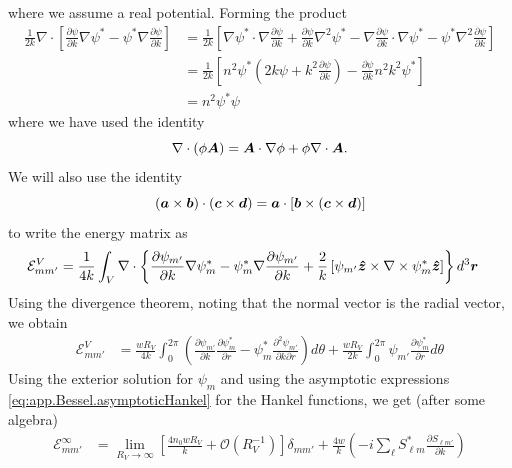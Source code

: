 where we assume a real potential.
Forming the product
  \begin{align*}
   \frac{1}{2k}\nabla\cdot\left[\frac{\partial\psi}{\partial k}\nabla\psi^*-\psi^*\nabla\frac{\partial\psi}{\partial k}\right]
	&= \frac{1}{2k}\left[\nabla\psi^*\cdot\nabla\frac{\partial\psi}{\partial k}+\frac{\partial\psi}{\partial k}\nabla^2\psi^*
			  -\nabla\frac{\partial\psi}{\partial k}\cdot\nabla\psi^*-\psi^*\nabla^2\frac{\partial\psi}{\partial k}\right]	\\
	&= \frac{1}{2k}\left[n^2\psi^*\left(2k\psi+k^2\frac{\partial\psi}{\partial k}\right)-\frac{\partial\psi}{\partial k}n^2k^2\psi^*\right]\\
	&= n^2\psi^*\psi
  \end{align*}
where we have used the identity \cite[Appendix II]{STR41}
  \begin{equation}
    \nabla\cdot\left(\phi\boldsymbol{A}\right) = \boldsymbol{A}\cdot\nabla\phi+\phi\nabla\cdot\boldsymbol{A}.
  \end{equation}
We will also use the
identity
  \begin{equation}
    (\boldsymbol{a}\times\boldsymbol{b})\cdot(\boldsymbol{c}\times\boldsymbol{d}) = \boldsymbol{a}\cdot\left[\boldsymbol{b}\times(\boldsymbol{c}\times\boldsymbol{d})\right]
  \end{equation}
to write the energy matrix as
  \begin{align}
    \mathcal{E}^V_{mm'} &= \frac{1}{4k}\int_V\nabla\cdot
			    \left\{
			      \frac{\partial\psi_{m'}}{\partial k}\nabla\psi^*_{m}-\psi^*_m\nabla\frac{\partial\psi_{m'}}{\partial k}
			+   \frac{2}{k}\left[\psi_{m'}\boldsymbol{\hat{z}}\times\nabla\times\psi^*_m\boldsymbol{\hat{z}}\right]\right\}d^3\boldsymbol{r}
  \end{align}
Using the divergence theorem, noting that the normal vector
is the radial vector, we obtain
  \begin{align}
    \mathcal{E}^V_{mm'}	&= \frac{wR_V}{4k}
			  \int_0^{2\pi}\left(\frac{\partial\psi_{m'}}{\partial k}\frac{\partial\psi^*_m}{\partial r}
					      -\psi^*_m\frac{\partial^2\psi_{m'}}{\partial k\partial r}\right)d\theta	\nonumber
			+\frac{wR_V}{2k}
			  \int_0^{2\pi}\psi_{m'}\frac{\partial\psi^*_m}{\partial r} d\theta
  \end{align}
Using the exterior solution for $\psi_m$ and using the 
asymptotic expressions \eqref{eq:app.Bessel.asymptoticHankel} for the Hankel functions, we get
(after some algebra)
  \begin{align}
   \mathcal{E}^{\infty}_{mm'} &= \lim_{R_V\rightarrow\infty}\left[\frac{4n_0wR_V}{k}+\mathcal{O}(R_V^{-1})\right]\delta_{mm'}
			      + \frac{4w}{k}\left(-i\sum_\ell S^*_{\ell m}\frac{\partial S_{\ell m'}}{\partial k}\right)
  \end{align}
